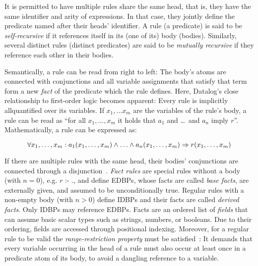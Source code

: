 It is permitted to have multiple rules share the same head, that is,
they have the same identifier and arity of expressions.
In that case, they jointly define the predicate named after their heads' identifier.
A rule (a predicate) is said to be \emph{self-recursive}
if it references itself in its (one of its) body (bodies).
Similarly, several distinct rules (distinct predicates) are said to be
\emph{mutually recursive} if they reference each other in their bodies.

Semantically, a rule can be read from right to left: The body's atoms are
connected with conjunctions and all variable assignments that satisfy that term
form a new \emph{fact} of the predicate which the rule defines.
Here, Datalog's close relationship to first-order logic becomes apparent:
Every rule is implicitly allquantified over its variables.
If \(x_1, \ldots x_m\) are the variables of the rule's body, a rule can be read as
``for all \(x_1, \ldots, x_m\) it holds that \(a_1\) and \ldots\ and \(a_n\) imply \(r\)''.
Mathematically, a rule can be expressed as\footnotemark{}:


\begin{equation}
	\forall x_1, \ldots, x_m: a_1(x_1, \ldots, x_m) \land \ldots \land a_n(x_1, \ldots, x_m) \Rightarrow r(x_1, \ldots, x_m) \\
\end{equation}

If there are multiple rules with the same head, their bodies' conjunctions
are connected through a disjunction~\cite{abo2024convergence}.
\emph{Fact rules} are special rules without a body (with $n=0$), e.g.
\( r \text{ :- } .\), and define \acp{EDBP}, whose facts are called
\emph{base facts}, are externally given, and assumed to be unconditionally true.
Regular rules with a non-empty body (with $n>0$) define \acp{IDBP}
and their facts are called \emph{derived facts}.
Only \acp{IDBP} may reference \acp{EDBP}.
Facts are an ordered list of \emph{fields} that can assume basic scalar
types such as strings, numbers, or booleans.
Due to their ordering, fields are accessed through positional indexing.
Moreover, for a regular rule to be valid the \emph{range-restriction property}
must be satisfied~\cite{green2013datalog}:
It demands that every variable occurring in the head of a rule must also occur
at least once in a predicate atom of its body, to avoid a dangling reference
to a variable.

